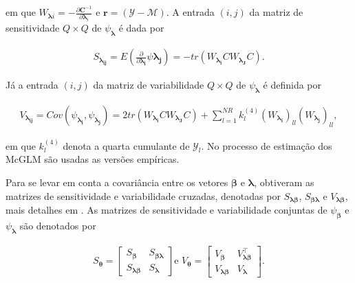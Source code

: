 \documentclass[AMA,STIX1COL]{WileyNJD-v2}
\begin{document}
\noindent em que $W_{\boldsymbol{\lambda}i} = -\frac{\partial \boldsymbol{C}^{-1}}{\partial \boldsymbol{\lambda}_i}$ e $\boldsymbol{r} = (\mathcal{Y} - \mathcal{M})$. A entrada $(i,j)$ da matriz de sensitividade $Q \times Q$ de $\psi_{\boldsymbol{\lambda}}$ é dada por

$$
  \begin{aligned}
    S_{\boldsymbol{\lambda_{ij}}} = E \left (\frac{\partial }{\partial \boldsymbol{\lambda_{i}}} \psi \boldsymbol{\lambda_{j}}\right) = -tr(W_{\boldsymbol{\lambda_{i}}} CW_{\boldsymbol{\lambda_{J}}} C).
  \end{aligned}
$$

\noindent Já a entrada $(i,j)$ da matriz de variabilidade $Q \times Q$ de $\psi_{\boldsymbol{\lambda}}$ é definida por

$$
  \begin{aligned}
V_{\boldsymbol{\lambda_{ij}}} = Cov\left ( \psi_{\boldsymbol{\lambda_{i}}}, \psi_{\boldsymbol{\lambda_{j}}} \right) = 2tr(W_{\boldsymbol{\lambda_{i}}} CW_{\boldsymbol{\lambda_{J}}} C) + \sum_{l=1}^{NR} k_{l}^{(4)} (W_{\boldsymbol{\lambda_{i}}})_{ll} (W_{\boldsymbol{\lambda_{j}}})_{ll},
  \end{aligned}
$$

\noindent em que $k_{l}^{(4)}$ denota a quarta cumulante de $\mathcal{Y}_{l}$. No processo de estimação dos McGLM são usadas as versões empíricas.

Para se levar em conta a covariância entre os vetores $\boldsymbol{\beta}$ e $\boldsymbol{\lambda}$, \cite{Bonat16} obtiveram as matrizes de sensitividade e variabilidade cruzadas, denotadas por $S_{\boldsymbol{\lambda \beta}}$, $S_{\boldsymbol{\beta \lambda}}$ e $V_{\boldsymbol{\lambda \beta}}$, mais detalhes em \cite{Bonat16}. As matrizes de sensitividade e variabilidade conjuntas de $\psi_{\boldsymbol{\beta}}$ e $\psi_{\boldsymbol{\lambda}}$ são denotados por

$$
  \begin{aligned}
    S_{\boldsymbol{\theta}} = \begin{bmatrix}
      S_{\boldsymbol{\beta}} & S_{\boldsymbol{\beta\lambda}} \\ 
      S_{\boldsymbol{\lambda\beta}} & S_{\boldsymbol{\lambda}} 
      \end{bmatrix} \text{e } V_{\boldsymbol{\theta}} = \begin{bmatrix}
      V_{\boldsymbol{\beta}} & V^{\top}_{\boldsymbol{\lambda\beta}} \\ 
      V_{\boldsymbol{\lambda\beta}} & V_{\boldsymbol{\lambda}} 
    \end{bmatrix}.
  \end{aligned}
$$
\end{document}
